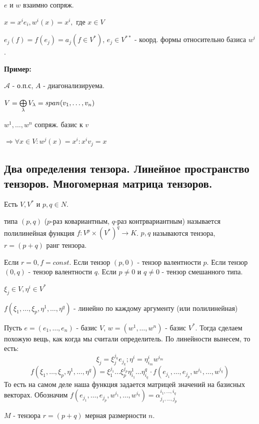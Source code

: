 $e \text{ и }w$ взаимно сопряж.

$x=x^ie_i, w^i(x)=x^i,$ где $x \in V$

$e_j(f)=f(e_j)=a_j(f \in V^*)$, $e_j \in V^{**}$ - коорд. формы относительно базиса $w^i$.



\textbf{Пример:}

$\mathcal{A}$ - о.п.с, $A$ - диагонализируема.

$V = \bigoplus\limits_{\lambda}V_{\lambda} = span (v_1,\ldots,v_n)$

$w^1,\ldots,w^n$ сопряж. базис к $v$  %

$\Rightarrow \forall x \in V: w^j(x) =x^i: x^iv_j = x$ 

\newpage
\subsection{Два определения тензора. Линейное пространство тензоров. Многомерная матрица тензоров.}

 Есть $V,V^*$ и $p,q \in N$.

 типа $(p,q)$ ($p$-раз ковариантным, $q$-раз контрвариантным) называется полилинейная функция $f: V^p\times (V^*)^q \rightarrow K$. $p,q$ называются  тензора, $r = (p+q)$ ранг тензора.

Если $r = 0, f = const$. Если тензор $(p,0) $ -  тензор валентности $p$. Если тензор $(0,q)$ -  тензор валентности $q$. Если $p\neq 0 $ и $q\neq 0$ - тензор смешанного типа.

$\xi_j \in V, \eta^i \in V^*$

$f(\xi_1,\ldots,\xi_p,\eta^1,\ldots, \eta^q)$ - линейно по каждому аргументу (или полилинейная)

Пусть $e = (e_1,\ldots, e_n)$ - базис $V$, $w = (w^1,\ldots, w^n)$ - базис $V^*$. Тогда сделаем похожую вещь, как когда мы считали определитель. По линейности вынесем, то есть:
$$\xi_j = \xi_j^{j_k}e_{j_k};\eta^i = \eta_{i_m}^iw^{i_m}$$
$$f(\xi_1,\ldots,\xi_p,\eta^1,\ldots, \eta^q) = \xi_1^{j_1}\ldots\xi_p^{j_p}\eta_{i_1}^1 \ldots \eta^q_{i_q} \cdot f(e_{j_1},\ldots, e_{j_p},w^{i_1},\ldots, w^{i_q})$$
То есть  на самом деле наша функция задается матрицей значений на базисных векторах. Обозначим $f(e_{j_1},\ldots, e_{j_p},w^{i_1},\ldots, w^{i_q}) = \alpha_{j_1,\ldots,j_p}^{i_1,\ldots,i_q}$

 $M$ -  тензора $r = (p+q)$ мерная размерности $n$. 


